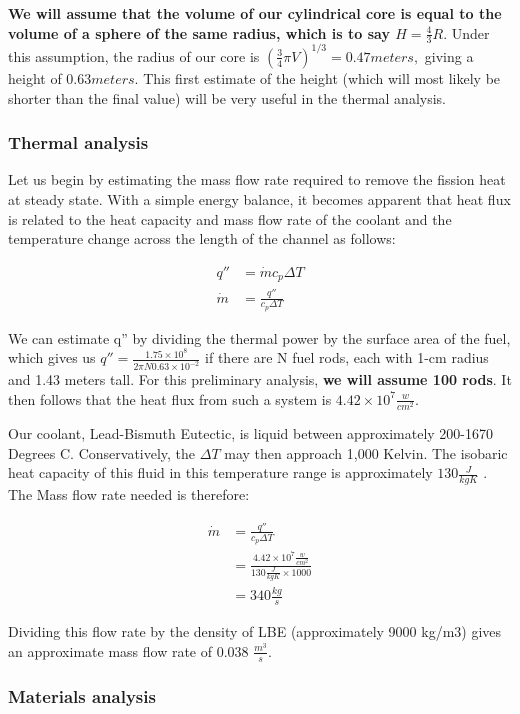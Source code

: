 \documentclass[12pt]{article}
\begin{document}
\textbf{We will assume that the volume of our cylindrical core is equal to the volume of a sphere of the same radius, which is to say $H = \frac{4}{3} R$}. Under this assumption, the radius of our core is $(\frac{3}{4} \pi V) ^ {1/3} = 0.47 meters,$ giving a height of $0.63 meters$. This first estimate of the height (which will most likely be shorter than the final value) will be very useful in the thermal analysis.   
\subsubsection{Thermal analysis}
Let us begin by estimating the mass flow rate required to remove the fission heat at steady state. With a simple energy balance, it becomes apparent that heat flux is related to the heat capacity and mass flow rate of the coolant and the temperature change across the length of the channel as follows:

\begin{align}
q'' &= \dot{m} c_p \Delta T \\
\dot{m} &= \frac{q''}{c_p \Delta T}
\end{align}

We can estimate q'' by dividing the thermal power by the surface area of the fuel, which gives us $q'' = \frac{1.75 \times 10^8}{2 \pi N 0.63 \times 10 ^{-2}}$ if there are N fuel rods, each with 1-cm radius and 1.43 meters tall. For this preliminary analysis, \textbf{we will assume 100 rods}. It then follows that the heat flux from such a system is $4.42 \times 10^7 \frac{w}{cm^2}$. 

Our coolant, Lead-Bismuth Eutectic, is liquid between approximately 200-1670 Degrees C. Conservatively, the $\Delta T$ may then approach 1,000 Kelvin. The isobaric heat capacity of this fluid in this temperature range is approximately $130 \frac{J}{kg K}$ \cite{LBE_properties}. The Mass flow rate needed is therefore:

\begin{align}
\dot{m} &= \frac{q''}{c_p \Delta T} \\
 &= \frac{4.42 \times 10^7 \frac{w}{cm^2}}{130 \frac{J}{kg K} \times 1000} \\
 &= 340 \frac{kg}{s}
\end{align} 

Dividing this flow rate by the density of LBE (approximately 9000 kg/m3) gives an approximate mass flow rate of 0.038 $\frac{m^3}{s}$.

\subsubsection{Materials analysis}
\end{document}
